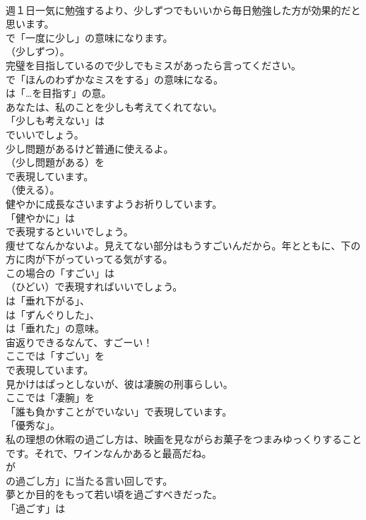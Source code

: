 \documentclass[8pt]{extreport}
\begin{document}
\begin{CJK}{UTF8}{min}
\\	週１日一気に勉強するより、少しずつでもいいから毎日勉強した方が効果的だと思います。 
\\	で「一度に少し」の意味になります。
\\	（少しずつ）。	
\\	完璧を目指しているので少しでもミスがあったら言ってください。 
\\	で「ほんのわずかなミスをする」の意味になる。
\\	は「…を目指す」の意。	
\\	あなたは、私のことを少しも考えてくれてない。 
\\	「少しも考えない」は
\\	でいいでしょう。	
\\	少し問題があるけど普通に使えるよ。 
\\	（少し問題がある）を
\\	で表現しています。
\\	（使える）。	
\\	健やかに成長なさいますようお祈りしています。 
\\	「健やかに」は 
\\	で表現するといいでしょう。	
\\	痩せてなんかないよ。見えてない部分はもうすごいんだから。年とともに、下の方に肉が下がっていってる気がする。 
\\	この場合の「すごい」は
\\	（ひどい）で表現すればいいでしょう。
\\	は「垂れ下がる」、
\\	は「ずんぐりした」、
\\	は「垂れた」の意味。	
\\	宙返りできるなんて、すごーい！ 
\\	ここでは「すごい」を 
\\	で表現しています。	
\\	見かけはぱっとしないが、彼は凄腕の刑事らしい。 
\\	ここでは「凄腕」を
\\	「誰も負かすことがでいない」で表現しています。
\\	「優秀な」。	
\\	私の理想の休暇の過ごし方は、映画を見ながらお菓子をつまみゆっくりすることです。それで、ワインなんかあると最高だね。 
\\	が
\\	の過ごし方」に当たる言い回しです。	
\\	夢とか目的をもって若い頃を過ごすべきだった。 
\\	「過ごす」は

\end{CJK}
\end{document}
